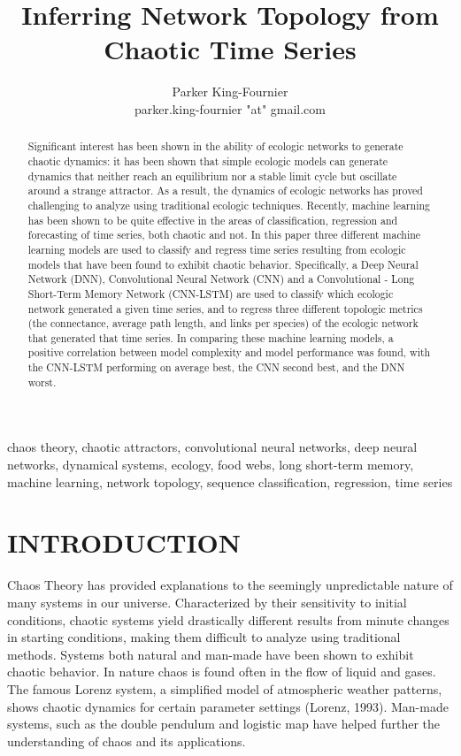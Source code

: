 \documentclass[letterpaper, 10 pt, conference]{ieeeconf}  %
\title{\LARGE \bf
Inferring Network Topology from Chaotic Time Series
}
\author{Parker King-Fournier \\
		parker.king-fournier "at" gmail.com}
\begin{document}
\maketitle
\thispagestyle{empty}
\pagestyle{empty}

\begin{abstract}
Signiﬁcant interest has been shown in the ability of ecologic networks to generate chaotic dynamics: it has been shown that simple ecologic models can generate dynamics that neither reach an equilibrium nor a stable limit cycle but oscillate around a strange attractor. As a result, the dynamics of ecologic networks has proved challenging to analyze using traditional ecologic techniques. Recently, machine learning has been shown to be quite effective in the areas of classification, regression and forecasting of time series, both chaotic and not. In this paper three different machine learning models are used to classify and regress time series resulting from ecologic models that have been found to exhibit chaotic behavior. Specifically, a Deep Neural Network (DNN), Convolutional Neural Network (CNN) and a Convolutional - Long Short-Term Memory Network (CNN-LSTM) are used to classify which ecologic network generated a given time series, and to regress three different topologic metrics (the connectance, average path length, and links per species) of the ecologic network that generated that time series. In comparing these machine learning models, a positive correlation between model complexity and model performance was found, with the CNN-LSTM performing on average best, the CNN second best, and the DNN worst.
\end{abstract}
\begin{keywords}
chaos theory, chaotic attractors, convolutional neural networks, deep neural networks, dynamical systems, ecology, food webs, long short-term memory, machine learning, network topology, sequence classiﬁcation, regression, time series 
\end{keywords}


\section{INTRODUCTION}
	Chaos Theory has provided explanations to the seemingly unpredictable nature of many systems in our universe. Characterized by their sensitivity to initial conditions, chaotic systems yield drastically different results from minute changes in starting conditions, making them difficult to analyze using traditional methods. Systems both natural and man-made have been shown to exhibit chaotic behavior. In nature chaos is found often in the flow of liquid and gases. The famous Lorenz system, a simplified model of atmospheric weather patterns, shows chaotic dynamics for certain parameter settings (Lorenz, 1993). Man-made systems, such as the double pendulum and logistic map have helped further the understanding of chaos and its applications.
\end{document}

